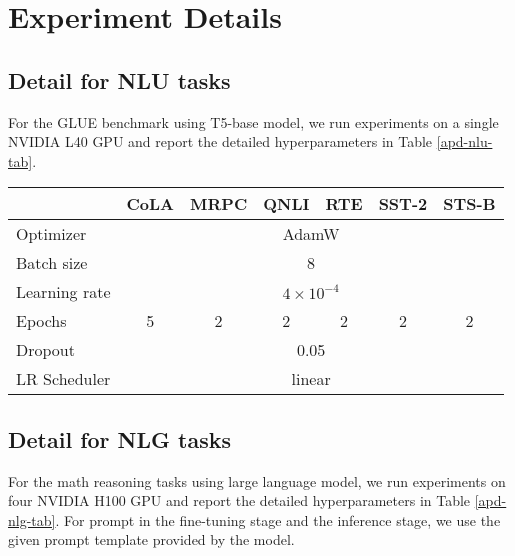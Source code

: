 \section{Experiment Details}
\subsection{Detail for NLU tasks}
\label{apd-nlu-detail}
For the GLUE benchmark using T5-base model, we run experiments on a single NVIDIA L40 GPU and report the detailed hyperparameters in Table \ref{apd-nlu-tab}. 

\begin{table*}[htb]
    \label{apd-nlu-tab}
    \centering
    \caption{Hyperparameter settings for fine-tuning T5-base on GLUE.}
\begin{tabular}{lcccccc}
\toprule
 & CoLA & MRPC & QNLI & RTE & SST-2 & STS-B \\
\midrule
Optimizer & \multicolumn{6}{c}{AdamW} \\
Batch size & \multicolumn{6}{c}{8} \\
Learning rate & \multicolumn{6}{c}{$4\times 10^{-4}$} \\
Epochs & 5 & 2 & 2 & 2 & 2 & 2 \\
Dropout & \multicolumn{6}{c}{0.05} \\
LR Scheduler & \multicolumn{6}{c}{linear} \\
\bottomrule
\end{tabular}
\end{table*}

\subsection{Detail for NLG tasks}
\label{apd-nlg-detail}
For the math reasoning tasks using large language model, we run experiments on four NVIDIA H100 GPU and report the detailed hyperparameters in Table \ref{apd-nlg-tab}. For prompt in the fine-tuning stage and the inference stage, we use the given prompt template provided by the model. 

